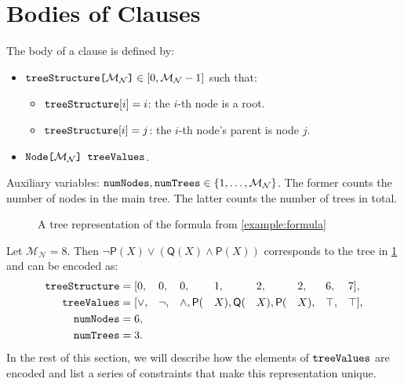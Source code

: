 \documentclass[runningheads]{llncs}
\newcommand{\variable}[1]{\texttt{\textup{#1}}}
\newcommand{\arrayd}[3]{\variable{{#1}[}{#2}\variable{]} \in {#3}}
\newcommand{\arrayt}[3]{\variable{{#3}[}{#2}\variable{] {#1}}}
\newcommand{\maxNumNodes}{\mathcal{M}_{\mathcal{N}}}
\begin{document}
\section{Bodies of Clauses}

\begin{definition}
  The body of a clause is defined by:
  \begin{itemize}
  \item $\arrayd{treeStructure}{\maxNumNodes{}}{[0, \maxNumNodes{} - 1]}$ such
    that:
    \begin{itemize}
    \item $\variable{treeStructure}[i] = i$: the $i$-th node is a root.
    \item $\variable{treeStructure}[i] = j$: the $i$-th node's parent is node $j$.
    \end{itemize}
  \item $\arrayt{treeValues}{\maxNumNodes{}}{Node}$.
  \end{itemize}
\end{definition}

Auxiliary variables: $\variable{numNodes}, \variable{numTrees} \in \{ 1, \dots,
\maxNumNodes{} \}$. The former counts the number of nodes in the main tree. The
latter counts the number of trees in total.

\begin{figure}[t]
  \centering
  \caption{A tree representation of the formula from \cref{example:formula}}
  \label{fig:example_tree}
\end{figure}

\begin{example} \label{example:formula}
  Let $\maxNumNodes{} = 8$. Then $\neg\mathsf{P}(X) \lor (\mathsf{Q}(X)
  \land \mathsf{P}(X))$ corresponds to the tree in \cref{fig:example_tree} and
  can be encoded as:
  \begin{alignat*}{8}
    \variable{treeStructure} &= [0, &&0, &&0, &&1, &&2, &&2, &&6, &&7],\\
    \variable{treeValues} &= [{\lor}, &&{\neg}, &&{\land}, \mathsf{P}(&&X), \mathsf{Q}(&&X), \mathsf{P}(&&X), &&\top, &&\top],\\
    \variable{numNodes} &= 6, && && && && && && &&\\
    \variable{numTrees} &= 3. && && && && && && &&
  \end{alignat*}
  In the rest of this section, we will describe how the elements of
  $\variable{treeValues}$ are encoded and list a series of constraints that make
  this representation unique.
\end{example}
\end{document}
